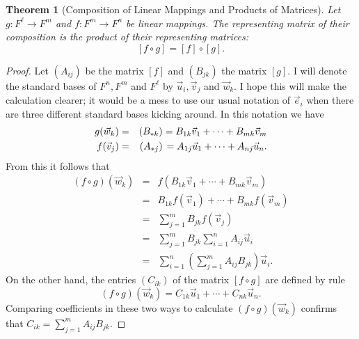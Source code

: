 \documentclass[11pt]{amsbook}
\newtheorem{theorem}{Theorem}[section]
\theoremstyle{definition}
\begin{document}
\begin{theorem}[Composition of Linear Mappings and Products of Matrices] \label{compmat}Let $g: F^{\ell} \to F^m$ and $f: F^m \to F^n$ be linear mappings. The representing matrix of their composition is the product of their representing matrices: $$[f\circ g] = [f]\circ [g].$$
\end{theorem}
\begin{proof}
Let $(A_{ij})$ be the matrix $[f]$ and $(B_{jk})$ the matrix $[g]$. I will denote the standard bases of $F^n, F^m$ and $F^{\ell}$ by ${\vec u}_i, {\vec v}_j$ and ${\vec w}_k$. I hope this will make the calculation clearer; it would be a mess to use our usual notation of $\vec{ e}_i$ when there are three different standard bases kicking around. In this notation we have
\begin{eqnarray*}
g({\vec w}_k) & = & (B_{\ast k}) = B_{1k}\vec{v}_1 + \cdots + B_{mk}\vec{v}_m \\
f({\vec v}_j) & = & (A_{\ast j})  \hspace{0.05cm} =  A_{1j}{\vec u}_1 + \cdots + A_{nj}{\vec u}_n.
\end{eqnarray*}
From this it follows that
\begin{eqnarray*}
(f\circ g)({\vec w}_k) & = & f( B_{1k}\vec{v}_1 + \cdots + B_{mk}\vec{v}_m ) \\ & = & B_{1k}f({\vec v}_1) + \cdots + B_{mk} f({\vec v}_m) \\ & = & \sum_{j=1}^m B_{jk} f({\vec v}_j) \\ & = & \sum_{j=1}^m B_{jk} \sum_{i=1}^n A_{ij} {\vec u}_i \\ & = & \sum_{i=1}^n \left( \sum_{j=1}^m A_{ij}B_{jk} \right) {\vec u}_i.
\end{eqnarray*}
On the other hand, the entries $(C_{ik})$ of the matrix $[f\circ g]$ are defined by rule $$(f\circ g)({\vec w}_k) = C_{1k}{\vec u}_1 + \cdots + C_{nk}{\vec u}_n.$$ Comparing coefficients in these two ways to calculate $(f\circ g)({\vec w}_k)$ confirms that $C_{ik} = \sum_{j=1}^m A_{ij}B_{jk}.$
\end{proof}
\end{document}

